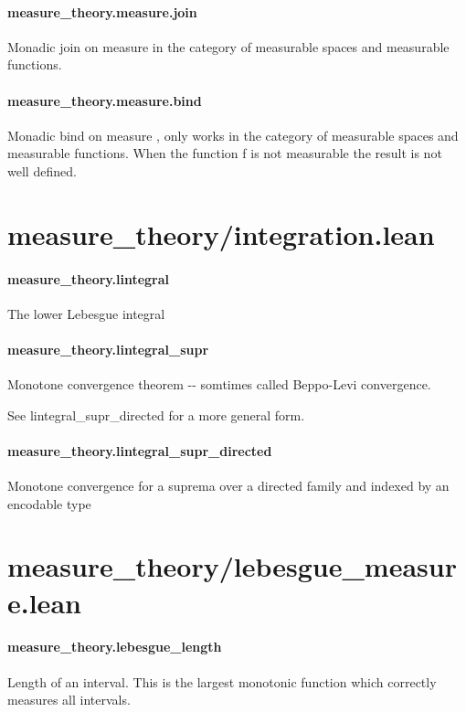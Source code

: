 \documentclass{article}
\begin{document}
\paragraph{measure\_theory.measure.join}
\par
Monadic join on 
\colorbox[RGB]{253,246,227}{{{{\color[RGB]{101, 123, 131} measure }}}} in the category of measurable spaces and measurable
functions.
\paragraph{measure\_theory.measure.bind}
\par
Monadic bind on 
\colorbox[RGB]{253,246,227}{{{{\color[RGB]{101, 123, 131} measure }}}}, only works in the category of measurable spaces and measurable
functions. When the function 
\colorbox[RGB]{253,246,227}{{{{\color[RGB]{101, 123, 131} f }}}} is not measurable the result is not well defined.
\section{measure\_theory/integration.lean}\paragraph{measure\_theory.lintegral}
\par
The lower Lebesgue integral
\paragraph{measure\_theory.lintegral\_supr}
\par
Monotone convergence theorem -{}- somtimes called Beppo-Levi convergence.
\par
See 
\colorbox[RGB]{253,246,227}{{{{\color[RGB]{101, 123, 131} lintegral\_supr\_directed }}}} for a more general form.
\paragraph{measure\_theory.lintegral\_supr\_directed}
\par
Monotone convergence for a suprema over a directed family and indexed by an encodable type
\section{measure\_theory/lebesgue\_measure.lean}\paragraph{measure\_theory.lebesgue\_length}
\par
Length of an interval. This is the largest monotonic function which correctly
measures all intervals.
\end{document}
